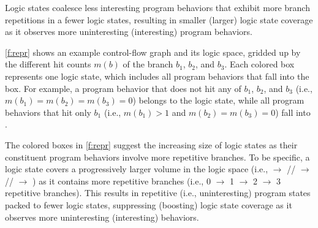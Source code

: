 \documentclass[letterpaper,twocolumn,10pt]{article}
\begin{document}
Logic states coalesce less interesting program behaviors that exhibit more
branch repetitions in a fewer logic states, resulting in smaller (larger) logic
state coverage as it observes more uninteresting (interesting) program
behaviors.


\autoref{f:repr} shows an example control-flow graph and its logic space,
gridded up by the different hit counts $m(b)$ of the branch $b_1$, $b_2$, and $b_3$.
Each colored box represents one logic state, which includes all program
behaviors that fall into the box.
For example, a program behavior that does not hit any of $b_1$, $b_2$, and $b_3$ 
(i.e., $m(b_1)=m(b_2)=m(b_3)=0$) belongs to the  logic state, while
all program behaviors that hit only $b_1$ (i.e., $m(b_1)>1$ and
$m(b_2)=m(b_3)=0$) fall into .

The colored boxes in \autoref{f:repr} suggest the increasing size of logic
states as their constituent program behaviors involve more repetitive branches.
To be specific, a logic state covers a progressively larger volume 
in the logic space 
(i.e.,  $\rightarrow$ //
$\rightarrow$ // $\rightarrow$
) as it contains more repetitive branches (i.e., 0 $\rightarrow$ 1
$\rightarrow$ 2 $\rightarrow$ 3 repetitive branches). 
%
This results in repetitive (i.e., uninteresting) program states packed
to fewer logic states, suppressing (boosting) logic state coverage as it observes more
uninteresting (interesting) behaviors.

\end{document}
